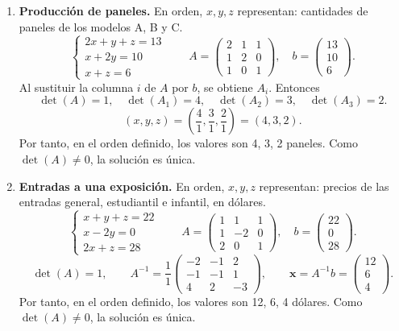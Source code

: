 \documentclass[11pt,a4paper]{article}
\begin{document}
\begin{enumerate}
Por tanto, en el orden definido, los valores son 2, 3, 4 litros. Como $\det(A)\ne0$, la solución es única.
\item \textbf{Producción de paneles.} En orden, $x,y,z$ representan: cantidades de paneles de los modelos A, B y C.
\[\begin{cases}2x+y+z=13\\x+2y=10\\x+z=6\end{cases}\qquad A=\begin{pmatrix}2&1&1\\1&2&0\\1&0&1\end{pmatrix},\quad b=\begin{pmatrix}13\\10\\6\end{pmatrix}.\]
Al sustituir la columna $i$ de $A$ por $b$, se obtiene $A_i$. Entonces
\[\det(A)=1,\quad \det(A_1)=4,\quad \det(A_2)=3,\quad \det(A_3)=2.\]
\[(x,y,z)=\left(\frac{4}{1},\frac{3}{1},\frac{2}{1}\right)=(4,3,2).\]
Por tanto, en el orden definido, los valores son 4, 3, 2 paneles. Como $\det(A)\ne0$, la solución es única.
\item \textbf{Entradas a una exposición.} En orden, $x,y,z$ representan: precios de las entradas general, estudiantil e infantil, en dólares.
\[\begin{cases}x+y+z=22\\x-2y=0\\2x+z=28\end{cases}\qquad A=\begin{pmatrix}1&1&1\\1&-2&0\\2&0&1\end{pmatrix},\quad b=\begin{pmatrix}22\\0\\28\end{pmatrix}.\]
\[\det(A)=1,\qquad A^{-1}=\frac{1}{1}\begin{pmatrix}-2&-1&2\\-1&-1&1\\4&2&-3\end{pmatrix},\qquad \mathbf{x}=A^{-1}b=\begin{pmatrix}12\\6\\4\end{pmatrix}.\]
Por tanto, en el orden definido, los valores son 12, 6, 4 dólares. Como $\det(A)\ne0$, la solución es única.

\end{enumerate}
\end{document}
